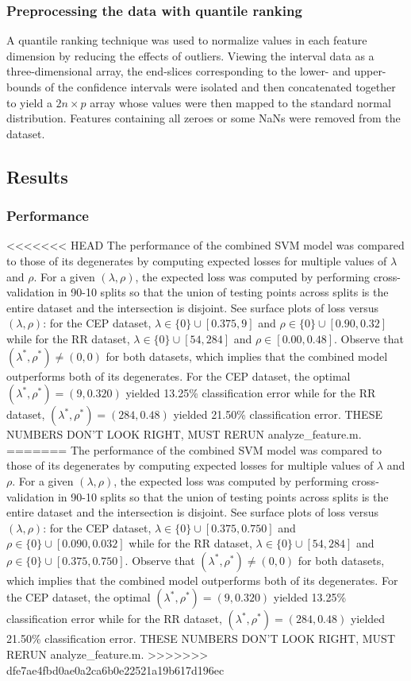 \documentclass[10pt]{article}
\theoremstyle{definition}
\begin{document}
\subsubsection{Preprocessing the data with quantile ranking}
A quantile ranking technique was used to normalize values in each feature dimension by reducing the effects of outliers. Viewing the interval data as a three-dimensional array, the end-slices corresponding to the lower- and upper-bounds of the confidence intervals were isolated and then concatenated together to yield a $2n\times p$ array whose values were then mapped to the standard normal distribution. Features containing all zeroes or some NaNs were removed from the dataset.

\subsection{Results}

\subsubsection{Performance}
<<<<<<< HEAD
The performance of the combined SVM model was compared to those of its degenerates by computing expected losses for multiple values of $\lambda$ and $\rho$.  For a given $(\lambda,\rho)$, the expected loss was computed by performing cross-validation in 90-10 splits so that the union of testing points across splits is the entire dataset and the intersection is disjoint. See surface plots of loss versus $(\lambda,\rho)$: for the CEP dataset, $\lambda\in \lbrace 0\rbrace\cup [0.375,9]$ and $\rho\in\lbrace 0\rbrace\cup [0.90,0.32]$ while for the RR dataset, $\lambda\in\lbrace 0\rbrace\cup [54,284]$ and $\rho\in[0.00,0.48]$. Observe that $(\lambda^*,\rho^*)\neq (0,0)$ for both datasets, which implies that the combined model outperforms both of its degenerates. For the CEP dataset, the optimal $(\lambda^*,\rho^*)=(9,0.320)$ yielded 13.25\% classification error while for the RR dataset, $(\lambda^*,\rho^*)=(284,0.48)$ yielded 21.50\% classification error. THESE NUMBERS DON'T LOOK RIGHT, MUST RERUN analyze_feature.m.
=======
The performance of the combined SVM model was compared to those of its degenerates by computing expected losses for multiple values of $\lambda$ and $\rho$.  For a given $(\lambda,\rho)$, the expected loss was computed by performing cross-validation in 90-10 splits so that the union of testing points across splits is the entire dataset and the intersection is disjoint. See surface plots of loss versus $(\lambda,\rho)$: for the CEP dataset, $\lambda\in \lbrace 0\rbrace\cup [0.375,0.750]$ and $\rho\in\lbrace 0\rbrace\cup [0.090,0.032]$ while for the RR dataset, $\lambda\in\lbrace 0\rbrace\cup [54,284]$ and $\rho\in\lbrace 0\rbrace\cup [0.375,0.750]$. Observe that $(\lambda^*,\rho^*)\neq (0,0)$ for both datasets, which implies that the combined model outperforms both of its degenerates. For the CEP dataset, the optimal $(\lambda^*,\rho^*)=(9,0.320)$ yielded 13.25\% classification error while for the RR dataset, $(\lambda^*,\rho^*)=(284,0.48)$ yielded 21.50\% classification error. THESE NUMBERS DON'T LOOK RIGHT, MUST RERUN analyze\_feature.m.
>>>>>>> dfe7ae4fbd0ae0a2ca6b0e22521a19b617d196ec
\end{document}
